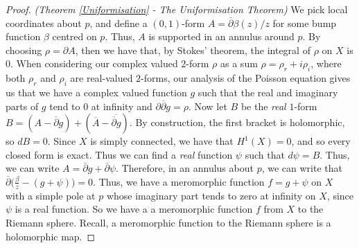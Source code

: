 \documentclass[11pt]{report}
\theoremstyle{definition}
\begin{document}
\begin{proof} \emph{(Theorem \ref{Uniformisation} - The Uniformisation Theorem)}
We pick local coordinates about $p$, and define a $(0,1)$-form $A=\overline{\partial}\beta(z)/z$ for some bump function $\beta$ centred on $p$. Thus, $A$ is supported in an annulus around $p$. By choosing $\rho = \partial A$, then we have that, by Stokes' theorem, the integral of $\rho$ on $X$ is $0$. When considering our complex valued $2$-form $\rho$ as a sum $\rho = \rho_r + i \rho_i$, where both $\rho_r$ and $\rho_i$ are real-valued $2$-forms, our analysis of the Poisson equation gives us that we have a complex valued function $g$ such that the real and imaginary parts of $g$ tend to $0$ at infinity and $\partial\overline{\partial}g = \rho$. Now let $B$ be the \emph{real} $1$-form $B=(A-\overline{\partial}g)+(\overline{A} - \overline{\overline{\partial}g})$. By construction, the first bracket is holomorphic, so $dB = 0$. Since $X$ is simply connected, we have that $H^1(X)=0$, and so every closed form is exact. Thus we can find a \emph{real} function $\psi$ such that $d\psi = B$. Thus, we can write $A = \overline{\partial}g + \overline{\partial}\psi$. Therefore, in an annulus about $p$, we can write that $\overline{\partial}\Big(\frac{\beta}{z} - (g+\psi)\Big) = 0$. Thus, we have a meromorphic function $f = g + \psi$ on $X$ with a simple pole at $p$ whose imaginary part tends to zero at infinity on $X$, since $\psi$ is a real function. So we have a a meromorphic function $f$ from $X$ to the Riemann sphere. Recall, a meromorphic function to the Riemann sphere is a holomorphic map. 


\end{proof}
\end{document}

